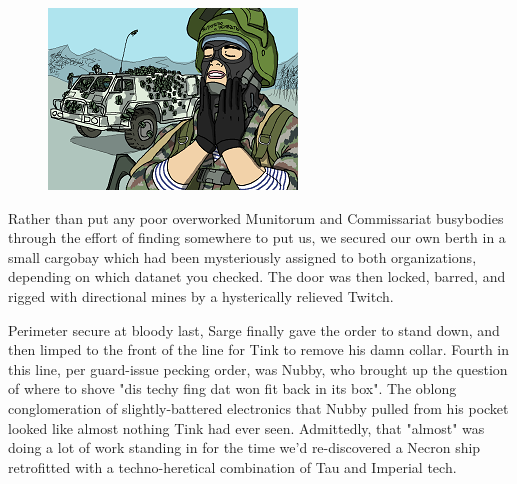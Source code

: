 \begin{figure}
	\begin{center}
		\includegraphics[width=\figwidth]{pics/21/118.png}
	\end{center}
\end{figure}
Rather than put any poor overworked Munitorum and Commissariat busybodies through the effort of finding somewhere to put us, we secured our own berth in a small cargobay which had been mysteriously assigned to both organizations, depending on which datanet you checked. 
The door was then locked, barred, and rigged with directional mines by a hysterically relieved Twitch.

Perimeter secure at bloody last, Sarge finally gave the order to stand down, and then limped to the front of the line for Tink to remove his damn collar. 
Fourth in this line, per guard-issue pecking order, was Nubby, who brought up the question of where to shove "dis techy fing dat won fit back in its box". 
The oblong conglomeration of slightly-battered electronics that Nubby pulled from his pocket looked like almost nothing Tink had ever seen. 
Admittedly, that "almost" was doing a lot of work standing in for the time we'd re-discovered a Necron ship retrofitted with a techno-heretical combination of Tau and Imperial tech.

